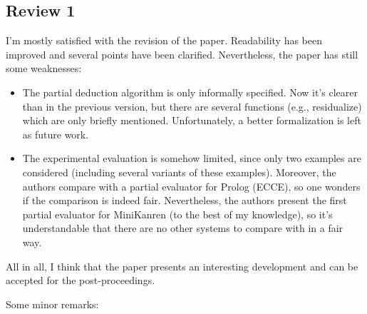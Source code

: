 
\subsection*{Review 1}

I'm mostly satisfied with the revision of the paper. Readability
has been improved and several points have been clarified.
Nevertheless, the paper has still some weaknesses:

\begin{itemize}
  \item The partial deduction algorithm is only informally specified.
  Now it's clearer than in the previous version, but there are
  several functions (e.g., residualize) which are only briefly
  mentioned. Unfortunately, a better formalization is left as
  future work.
  \item The experimental evaluation is somehow limited, since only
  two examples are considered (including several variants of these
  examples). Moreover, the authors compare with a partial evaluator
  for Prolog (ECCE), so one wonders if the comparison is indeed fair.
  Nevertheless, the authors present the first partial evaluator for
  MiniKanren (to the best of my knowledge), so it's understandable
  that there are no other systems to compare with in a fair way.
\end{itemize}

All in all, I think that the paper presents an interesting
development and can be accepted for the post-proceedings.

Some minor remarks:

